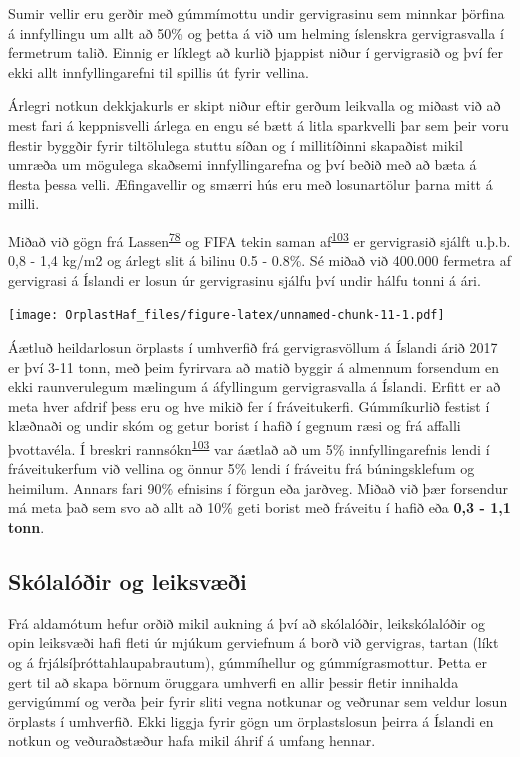 \documentclass[icelandic,]{book}
\begin{document}
Sumir vellir eru gerðir með gúmmímottu undir gervigrasinu sem minnkar þörfina á innfyllingu um allt að 50\% og þetta á við um helming íslenskra gervigrasvalla í fermetrum talið. Einnig er líklegt að kurlið þjappist niður í gervigrasið og því fer ekki allt innfyllingarefni til spillis út fyrir vellina.

Árlegri notkun dekkjakurls er skipt niður eftir gerðum leikvalla og miðast við að mest fari á keppnisvelli árlega en engu sé bætt á litla sparkvelli þar sem þeir voru flestir byggðir fyrir tiltölulega stuttu síðan og í millitíðinni skapaðist mikil umræða um mögulega skaðsemi innfyllingarefna og því beðið með að bæta á flesta þessa velli. Æfingavellir og smærri hús eru með losunartölur þarna mitt á milli.

Miðað við gögn frá Lassen\textsuperscript{\protect\hyperlink{ref-lassen2015microplastics}{78}} og FIFA tekin saman af\textsuperscript{\protect\hyperlink{ref-Hann2018}{103}} er gervigrasið sjálft u.þ.b. 0,8 - 1,4 kg/m2 og árlegt slit á bilinu 0.5 - 0.8\%. Sé miðað við 400.000 fermetra af gervigrasi á Íslandi er losun úr gervigrasinu sjálfu því undir hálfu tonni á ári.

\texttt{[image: OrplastHaf\_files/figure-latex/unnamed-chunk-11-1.pdf]}

Áætluð heildarlosun örplasts í umhverfið frá gervigrasvöllum á Íslandi árið 2017 er því 3-11 tonn, með þeim fyrirvara að matið byggir á almennum forsendum en ekki raunverulegum mælingum á áfyllingum gervigrasvalla á Íslandi. Erfitt er að meta hver afdrif þess eru og hve mikið fer í fráveitukerfi. Gúmmíkurlið festist í klæðnaði og undir skóm og getur borist í hafið í gegnum ræsi og frá affalli þvottavéla. Í breskri rannsókn\textsuperscript{\protect\hyperlink{ref-Hann2018}{103}} var áætlað að um 5\% innfyllingarefnis lendi í fráveitukerfum við vellina og önnur 5\% lendi í fráveitu frá búningsklefum og heimilum. Annars fari 90\% efnisins í förgun eða jarðveg. Miðað við þær forsendur má meta það sem svo að allt að 10\% geti borist með fráveitu í hafið eða \textbf{0,3 - 1,1 tonn}.

\hypertarget{skolaloir-og-leiksvi}{%
\subsection*{Skólalóðir og leiksvæði}\label{skolaloir-og-leiksvi}}

Frá aldamótum hefur orðið mikil aukning á því að skólalóðir, leikskólalóðir og opin leiksvæði hafi fleti úr mjúkum gerviefnum á borð við gervigras, tartan (líkt og á frjálsíþróttahlaupabrautum), gúmmíhellur og gúmmígrasmottur. Þetta er gert til að skapa börnum öruggara umhverfi en allir þessir fletir innihalda gervigúmmí og verða þeir fyrir sliti vegna notkunar og veðrunar sem veldur losun örplasts í umhverfið. Ekki liggja fyrir gögn um örplastslosun þeirra á Íslandi en notkun og veðuraðstæður hafa mikil áhrif á umfang hennar.
\end{document}
